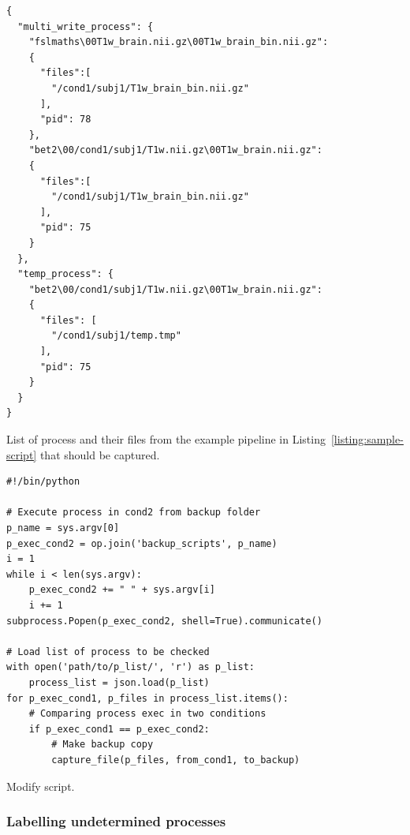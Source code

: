 \documentclass[a4paper,num-refs]{oup-contemporary}
\begin{document}
\begin{listing}
  \begin{verbatim}
{
  "multi_write_process": {
    "fslmaths\00T1w_brain.nii.gz\00T1w_brain_bin.nii.gz":
    {
      "files":[
        "/cond1/subj1/T1w_brain_bin.nii.gz"
      ],
      "pid": 78
    },
    "bet2\00/cond1/subj1/T1w.nii.gz\00T1w_brain.nii.gz":
    {
      "files":[
        "/cond1/subj1/T1w_brain_bin.nii.gz"
      ],
      "pid": 75
    }
  },
  "temp_process": {
    "bet2\00/cond1/subj1/T1w.nii.gz\00T1w_brain.nii.gz": 
    {
      "files": [
        "/cond1/subj1/temp.tmp"
      ],
      "pid": 75
    } 
  } 
}

\end{verbatim}
\caption{List of process and their files from the example pipeline in 
Listing~\ref{listing:sample-script} that should be captured.}
\label{listing:json_process}
\end{listing}

\begin{listing}
\begin{verbatim}
#!/bin/python

# Execute process in cond2 from backup folder
p_name = sys.argv[0]
p_exec_cond2 = op.join('backup_scripts', p_name)
i = 1
while i < len(sys.argv):
    p_exec_cond2 += " " + sys.argv[i]
    i += 1
subprocess.Popen(p_exec_cond2, shell=True).communicate()

# Load list of process to be checked
with open('path/to/p_list/', 'r') as p_list:
    process_list = json.load(p_list)
for p_exec_cond1, p_files in process_list.items():
    # Comparing process exec in two conditions
    if p_exec_cond1 == p_exec_cond2:
        # Make backup copy
        capture_file(p_files, from_cond1, to_backup)

\end{verbatim}
  \caption{Modify script.}
  \label{listing:modify-script}
\end{listing}



\subsubsection{Labelling undetermined processes} 
\end{document}
